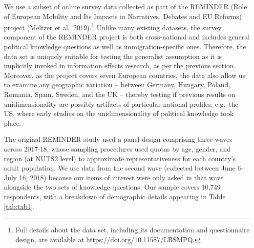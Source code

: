 \documentclass[11pt,halfline,a4paper,]{ouparticle}
\begin{document}
We use a subset of online survey data collected as part of the REMINDER
(Role of European Mobility and Its Impacts in Narratives, Debates and EU
Reforms) project (Meltzer et al.~2019).\footnote{Full details about the
  data set, including its documentation and questionnaire design, are
  available at https://doi.org/10.11587/LBSMPQ.} Unlike many existing
datasets, the survey component of the REMINDER project is both
cross-national and includes general political knowledge questions as
well as immigration-specific ones. Therefore, the data set is uniquely
suitable for testing the generalist assumption as it is implicitly
invoked in information effects research, as per the previous section.
Moreover, as the project covers seven European countries, the data also
allow us to examine any geographic variation -- between Germany,
Hungary, Poland, Romania, Spain, Sweden, and the UK -- thereby testing
if previous results on unidimensionality are possibly artifacts of
particular national profiles, e.g.~the US, where early studies on the
unidimensionality of political knowledge took place.

The original REMINDER study used a panel design comprising three waves
across 2017-18, whose sampling procedures used quotas by age, gender,
and region (at NUTS2 level) to approximate representativeness for each
country's adult population. We use data from the second wave (collected
between June 6-July 16, 2018) because our items of interest were only
asked in that wave alongside the two sets of knowledge questions. Our
sample covers 10,749 respondents, with a breakdown of demographic
details appearing in Table \ref{tab:tab1}.
\end{document}
